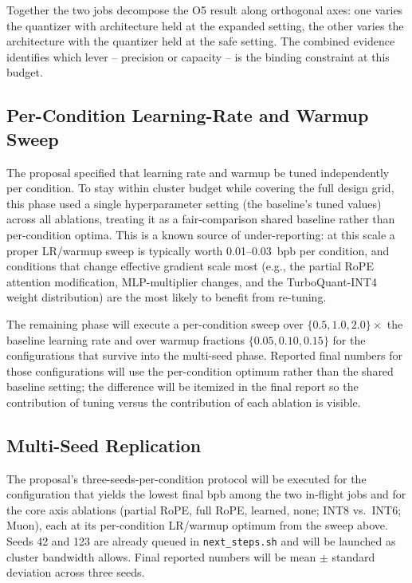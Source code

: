 \documentclass[11pt, letterpaper]{article}
\begin{document}
Together the two jobs decompose the O5 result along orthogonal
axes: one varies the quantizer with architecture held at the
expanded setting, the other varies the architecture with the
quantizer held at the safe setting. The combined evidence
identifies which lever -- precision or capacity -- is the
binding constraint at this budget.

\subsection{Per-Condition Learning-Rate and Warmup Sweep}

The proposal specified that learning rate and warmup be tuned
independently per condition. To stay within cluster budget while
covering the full design grid, this phase used a single
hyperparameter setting (the baseline's tuned values) across all
ablations, treating it as a fair-comparison shared baseline
rather than per-condition optima. This is a known source of
under-reporting: at this scale a proper LR/warmup sweep is
typically worth 0.01--0.03~bpb per condition, and conditions
that change effective gradient scale most (e.g., the partial
RoPE attention modification, MLP-multiplier changes, and the
TurboQuant-INT4 weight distribution) are the most likely to
benefit from re-tuning.

The remaining phase will execute a per-condition sweep over
$\{0.5, 1.0, 2.0\}\times$ the baseline learning rate and over
warmup fractions $\{0.05, 0.10, 0.15\}$ for the configurations
that survive into the multi-seed phase. Reported final numbers
for those configurations will use the per-condition optimum
rather than the shared baseline setting; the difference will
be itemized in the final report so the contribution of tuning
versus the contribution of each ablation is visible.

\subsection{Multi-Seed Replication}

The proposal's three-seeds-per-condition protocol will be
executed for the configuration that yields the lowest final
bpb among the two in-flight jobs and for the core axis
ablations (partial RoPE, full RoPE, learned, none; INT8 vs.\
INT6; Muon), each at its per-condition LR/warmup optimum from
the sweep above. Seeds 42 and 123 are already queued in
\texttt{next\_steps.sh} and will be launched as cluster
bandwidth allows. Final reported numbers will be
mean $\pm$ standard deviation across three seeds.
\end{document}
